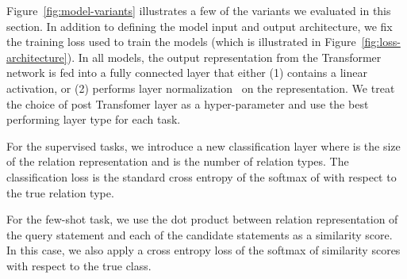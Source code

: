 \begin{comment}
\textbf{Entity mention pooling}
    Representation is obtained through max-pooling final hidden layers of corresponding
    to each word piece that belongs to the same entity mention, and
    concatenating these two vectors into a single representation: \\
    \\
    We refer to this architecture as \textsc{mention pooling}.

\textbf{Entity markers}
   Representation is obtained through concatenating the final hidden representations
   corresponding to the  and  positions of the statement
   ().
   Note that this representation is only possible for architectures where we add
   entity markers to the input of the model. We refer to this output representation as
   \textsc{entity markers} output.
   \end{comment}

Figure~\ref{fig:model-variants} illustrates a few of the variants we evaluated in this section.
In addition to defining the model input and output architecture, we fix the training loss
used to train the models (which is illustrated in Figure~\ref{fig:loss-architecture}).
In all models, the output representation from the Transformer network is fed into
a fully connected layer that either (1) contains a linear activation, or
(2) performs layer normalization~\cite{ba2016layer} on the representation. We treat the
choice of post Transfomer layer as a hyper-parameter and use the best performing layer
type for each task.

For the supervised tasks, we introduce a new classification layer
 where  is the size of the relation representation
and  is the number of relation types. The classification loss is the standard
cross entropy of the softmax of  with respect to the true relation type.

For the few-shot task, we use the dot product between relation representation of the query
statement and each of the candidate statements as a similarity score. In this case,
we also apply a cross entropy loss of the softmax of similarity scores with respect
to the true class.

